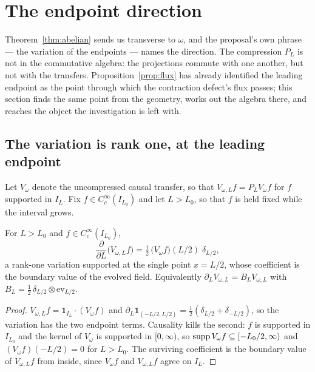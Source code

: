 \section{The endpoint direction}\label{sec:endpoint}

Theorem~\ref{thm:abelian} sends us transverse to $\omega$, and the proposal's own
phrase --- the variation of the endpoints --- names the direction. The compression
$P_L$ is not in the commutative algebra: the projections commute with one
another, but not with the transfers. Proposition~\ref{prop:flux} has already
identified the leading endpoint as the point through which the contraction
defect's flux passes; this section finds the same point from the geometry, works
out the algebra there, and reaches the object the investigation is left with.

\subsection{The variation is rank one, at the leading endpoint}

Let $V_\omega$ denote the uncompressed causal transfer, so that
$V_{\omega,L}f=P_LV_\omega f$ for $f$ supported in $I_L$. Fix
$f\in C_c^\infty(I_{L_0})$ and let $L>L_0$, so that $f$ is held fixed while the
interval grows.

\begin{proposition}\label{prop:endpoint}
For $L>L_0$ and $f\in C_c^\infty(I_{L_0})$,
\begin{equation}\label{eq:endpoint}
 \frac{\partial}{\partial L}\big(V_{\omega,L}f\big)
 =\tfrac12\,\big(V_\omega f\big)(L/2)\;\delta_{L/2},
\end{equation}
a rank-one variation supported at the single point $x=L/2$, whose coefficient is
the boundary value of the evolved field. Equivalently
$\partial_LV_{\omega,L}=B_LV_{\omega,L}$ with
$B_L=\frac12\,\delta_{L/2}\otimes\mathrm{ev}_{L/2}$.
\end{proposition}

\begin{proof}
$V_{\omega,L}f=\mathbf1_{I_L}\cdot(V_\omega f)$ and
$\partial_L\mathbf1_{(-L/2,L/2)}=\frac12(\delta_{L/2}+\delta_{-L/2})$, so the
variation has the two endpoint terms. Causality kills the second: $f$ is
supported in $I_{L_0}$ and the kernel of $V_\omega$ is supported in
$[0,\infty)$, so $\operatorname{supp} V_\omega f\subseteq[-L_0/2,\infty)$ and
$(V_\omega f)(-L/2)=0$ for $L>L_0$. The surviving coefficient is the boundary
value of $V_{\omega,L}f$ from inside, since $V_\omega f$ and $V_{\omega,L}f$
agree on $I_L$.
\end{proof}


